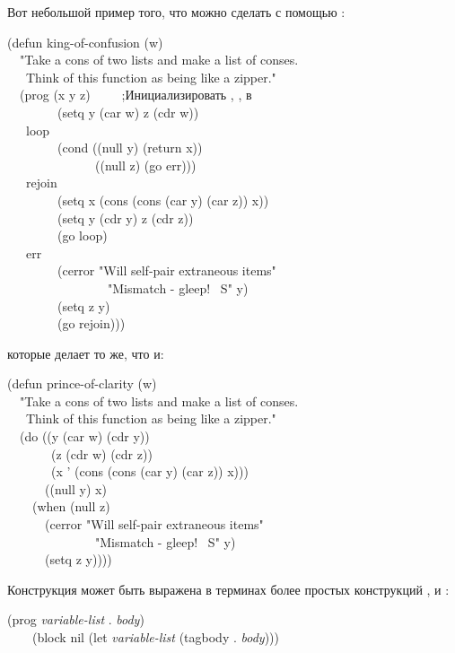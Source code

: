 \begin{defmac}
Вот небольшой пример того, что можно сделать с помощью :
\begin{lisp}
(defun king-of-confusion (w) \\
~~"Take a cons of two lists and make a list of conses. \\
~~~Think of this function as being like a zipper." \\
~~(prog (x y z)~~~~~;\textrm{Инициализировать , ,  в {\false}} \\
~~~~~~~~(setq y (car w) z (cdr w)) \\
~~~loop \\
~~~~~~~~(cond ((null y) (return x)) \\
~~~~~~~~~~~~~~((null z) (go err))) \\
~~~rejoin \\
~~~~~~~~(setq x (cons (cons (car y) (car z)) x)) \\
~~~~~~~~(setq y (cdr y) z (cdr z)) \\
~~~~~~~~(go loop) \\
~~~err \\
~~~~~~~~(cerror "Will self-pair extraneous items" \\
~~~~~~~~~~~~~~~~"Mismatch - gleep!  ~S" y) \\
~~~~~~~~(setq z y) \\
~~~~~~~~(go rejoin)))
\end{lisp}
которые делает то же, что и:
\begin{lisp}
(defun prince-of-clarity (w) \\
~~"Take a cons of two lists and make a list of conses. \\
~~~Think of this function as being like a zipper." \\
~~(do ((y (car w) (cdr y)) \\
~~~~~~~(z (cdr w) (cdr z)) \\
~~~~~~~(x '{\emptylist} (cons (cons (car y) (car z)) x))) \\
~~~~~~((null y) x) \\
~~~~(when (null z) \\
~~~~~~(cerror "Will self-pair extraneous items" \\
~~~~~~~~~~~~~~"Mismatch - gleep!  ~S" y) \\
~~~~~~(setq z y))))
\end{lisp}

Конструкция  может быть выражена в терминах более простых конструкций
,  и :
\begin{lisp}
(prog \emph{variable-list}  . \emph{body}) \\
~~~\EQ\ (block nil (let \emph{variable-list}  (tagbody . \emph{body})))
\end{lisp}


\end{defmac}
